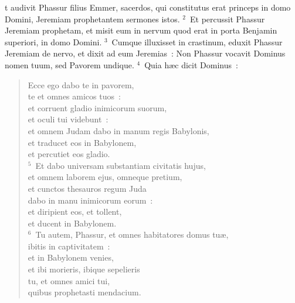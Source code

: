 \bchapter
{}t audivit Phassur filius Emmer, sacerdos, qui constitutus erat princeps in domo Domini, Jeremiam prophetantem sermones istos.
${}^{2}$~Et percussit Phassur Jeremiam prophetam, et misit eum in nervum quod erat in porta Benjamin superiori, in domo Domini.
${}^{3}$~Cumque illuxisset in crastinum, eduxit Phassur Jeremiam de nervo, et dixit ad eum Jeremias~: Non Phassur vocavit Dominus nomen tuum, sed Pavorem undique.
${}^{4}$~Quia h\ae c dicit Dominus~: \begin{flushleft}\begin{verse}Ecce ego dabo te in pavorem,\\ te et omnes amicos tuos~:\\ et corruent gladio inimicorum suorum,\\ et oculi tui videbunt~:\\ et omnem Judam dabo in manum regis Babylonis,\\ et traducet eos in Babylonem,\\ et percutiet eos gladio.\\
${}^{5}$~Et dabo universam substantiam civitatis hujus,\\ et omnem laborem ejus, omneque pretium,\\ et cunctos thesauros regum Juda\\ dabo in manu inimicorum eorum~:\\ et diripient eos, et tollent,\\ et ducent in Babylonem.\\
${}^{6}$~Tu autem, Phassur, et omnes habitatores domus tu\ae ,\\ ibitis in captivitatem~:\\ et in Babylonem venies,\\ et ibi morieris, ibique sepelieris\\ tu, et omnes amici tui,\\ quibus prophetasti mendacium.\end{verse}\end{flushleft}


